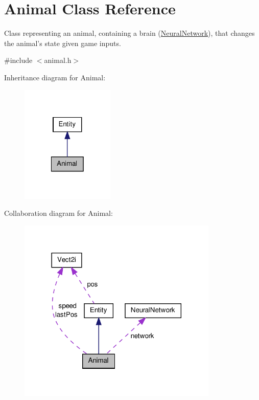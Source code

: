 \hypertarget{class_animal}{\section{Animal Class Reference}
\label{class_animal}
}


Class representing an animal, containing a brain (\hyperlink{class_neural_network}{Neural\-Network}), that changes the animal's state given game inputs.  




{\ttfamily \#include $<$animal.\-h$>$}



Inheritance diagram for Animal\-:\nopagebreak
\begin{figure}[H]
\begin{center}
\leavevmode
\includegraphics[width=126pt]{class_animal__inherit__graph}
\end{center}
\end{figure}


Collaboration diagram for Animal\-:
\nopagebreak
\begin{figure}[H]
\begin{center}
\leavevmode
\includegraphics[width=270pt]{class_animal__coll__graph}
\end{center}
\end{figure}
